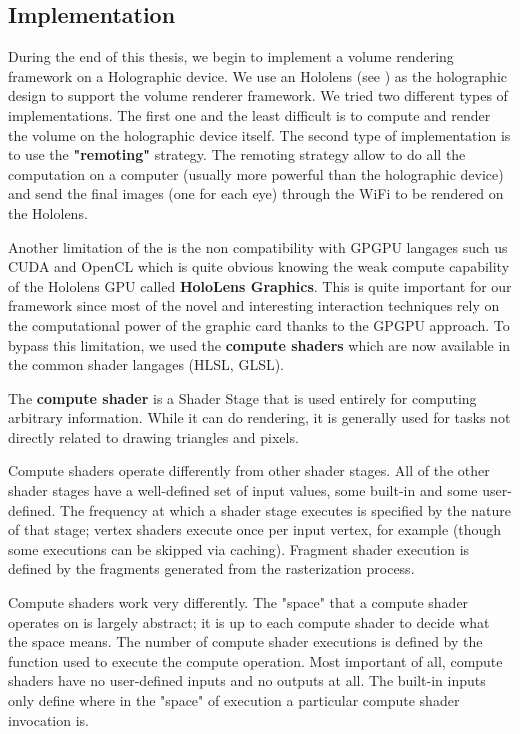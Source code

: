 \subsection{Implementation}

During the end of this thesis, we begin to implement a volume rendering framework on a Holographic device. We use an Hololens (see \cite{hololens}) as the holographic design to support the volume renderer framework. We tried two different types of implementations. The first one and the least difficult is to compute and render the volume on the holographic device itself. The second type of implementation is to use the \textbf{ "remoting" } strategy. The remoting strategy allow to do all the computation on a computer (usually more powerful than the holographic device) and send the final images (one for each eye) through the WiFi to be rendered on the Hololens.


Another limitation of the \cite{hololens} is the non compatibility with GPGPU langages such us CUDA and OpenCL which is quite obvious knowing the weak compute capability of the Hololens GPU called \textbf{HoloLens Graphics}. This is quite important for our framework since most of the novel and interesting interaction techniques rely on the computational power of the graphic card thanks to the GPGPU approach. \newline
To bypass this limitation, we used the \textbf{ compute shaders} which are now available  in the common shader langages (HLSL, GLSL).


The \textbf{ compute shader} is a Shader Stage that is used entirely for computing arbitrary information. While it can do rendering, it is generally used for tasks not directly related to drawing triangles and pixels.

Compute shaders operate differently from other shader stages. All of the other shader stages have a well-defined set of input values, some built-in and some user-defined. The frequency at which a shader stage executes is specified by the nature of that stage; vertex shaders execute once per input vertex, for example (though some executions can be skipped via caching). Fragment shader execution is defined by the fragments generated from the rasterization process.

Compute shaders work very differently. The "space" that a compute shader operates on is largely abstract; it is up to each compute shader to decide what the space means. The number of compute shader executions is defined by the function used to execute the compute operation. Most important of all, compute shaders have no user-defined inputs and no outputs at all. The built-in inputs only define where in the "space" of execution a particular compute shader invocation is.

